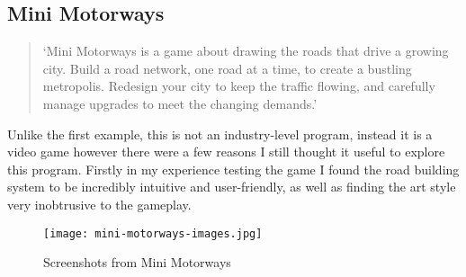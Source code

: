    \subsection{Mini Motorways}
    \label{mini-motorways}

    \begin{quote}
        `Mini Motorways is a game about drawing the roads that drive a growing city. Build a road network, one road at a time, to create a bustling metropolis. Redesign your city to keep the traffic flowing, and carefully manage upgrades to meet the changing demands.'\cite{mini-motorways}
    \end{quote}

    Unlike the first example, this is not an industry-level program, instead it is a video game however there were a few reasons I still thought it useful to explore this program. Firstly in my experience testing the game I found the road building system to be incredibly intuitive and user-friendly, as well as finding the art style very inobtrusive to the gameplay.

    \begin{figure}[ht]
        \centering
        \texttt{[image: mini-motorways-images.jpg]}
        \caption{Screenshots from Mini Motorways}
    \end{figure}


